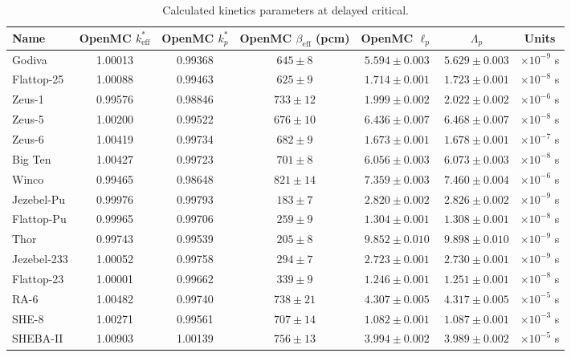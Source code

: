 \documentclass[12pt,preprint]{elsarticle}
\begin{document}
\begin{table}[H]
\centering
\caption{Calculated kinetics parameters at delayed critical.}
\label{tab:kinetics}
\footnotesize
\begin{tabular}{@{}lcccccc@{}}
\toprule
Name & OpenMC $k_{\mathrm{eff}}^*$ & OpenMC $k_p^*$ & OpenMC $\beta_{\mathrm{eff}}$ (pcm) & OpenMC $\ell_p$ & $\Lambda_p$ & Units \\
\midrule
Godiva      & 1.00013 & 0.99368 & $645 \pm 8$ & $5.594 \pm 0.003$ & $5.629 \pm 0.003$ & $\times 10^{-9}$ s \\
Flattop-25  & 1.00088 & 0.99463 & $625 \pm 9$ & $1.714 \pm 0.001$ & $1.723 \pm 0.001$ & $\times 10^{-8}$ s \\
Zeus-1      & 0.99576 & 0.98846 & $733 \pm 12$ & $1.999 \pm 0.002$ & $2.022 \pm 0.002$ & $\times 10^{-6}$ s \\
Zeus-5      & 1.00200 & 0.99522 & $676 \pm 10$ & $6.436 \pm 0.007$ & $6.468 \pm 0.007$ & $\times 10^{-8}$ s \\
Zeus-6      & 1.00419 & 0.99734 & $682 \pm 9$ & $1.673 \pm 0.001$ & $1.678 \pm 0.001$ & $\times 10^{-7}$ s \\
Big Ten     & 1.00427 & 0.99723 & $701 \pm 8$ & $6.056 \pm 0.003$ & $6.073 \pm 0.003$ & $\times 10^{-8}$ s \\
Winco       & 0.99465 & 0.98648 & $821 \pm 14$ & $7.359 \pm 0.003$ & $7.460 \pm 0.004$ & $\times 10^{-6}$ s \\
Jezebel-Pu  & 0.99976 & 0.99793 & $183 \pm 7$ & $2.820 \pm 0.002$ & $2.826 \pm 0.002$ & $\times 10^{-9}$ s \\
Flattop-Pu  & 0.99965 & 0.99706 & $259 \pm 9$ & $1.304 \pm 0.001$ & $1.308 \pm 0.001$ & $\times 10^{-8}$ s \\
Thor        & 0.99743 & 0.99539 & $205 \pm 8$ & $9.852 \pm 0.010$ & $9.898 \pm 0.010$ & $\times 10^{-9}$ s \\
Jezebel-233 & 1.00052 & 0.99758 & $294 \pm 7$ & $2.723 \pm 0.001$ & $2.730 \pm 0.001$ & $\times 10^{-9}$ s \\
Flattop-23  & 1.00001 & 0.99662 & $339 \pm 9$ & $1.246 \pm 0.001$ & $1.251 \pm 0.001$ & $\times 10^{-8}$ s \\
RA-6        & 1.00482 & 0.99740 & $738 \pm 21$ & $4.307 \pm 0.005$ & $4.317 \pm 0.005$ & $\times 10^{-5}$ s \\
SHE-8       & 1.00271 & 0.99561 & $707 \pm 14$ & $1.082 \pm 0.001$ & $1.087 \pm 0.001$ & $\times 10^{-3}$ s \\
SHEBA-II    & 1.00903 & 1.00139 & $756 \pm 13$ & $3.994 \pm 0.002$ & $3.989 \pm 0.002$ & $\times 10^{-5}$ s \\

\end{tabular}
\end{table}
\end{document}
